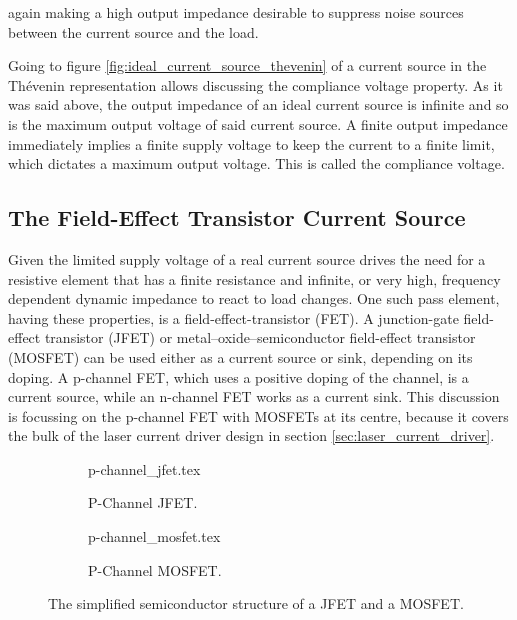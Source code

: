 again making a high output impedance desirable to suppress noise sources between the current source and the load.

Going to figure \ref{fig:ideal_current_source_thevenin} of a current source in the Thévenin representation allows discussing the compliance voltage property. As it was said above, the output impedance of an ideal current source is infinite and so is the maximum output voltage of said current source. A finite output impedance immediately implies a finite supply voltage to keep the current to a finite limit, which dictates a maximum output voltage. This is called the compliance voltage.

\subsection{The Field-Effect Transistor Current Source}%
\label{sec:mosfet_current_source}
Given the limited supply voltage of a real current source drives the need for a resistive element that has a finite resistance and infinite, or very high, frequency dependent dynamic impedance to react to load changes. One such pass element, having these properties, is a field-effect-transistor (FET). A junction-gate field-effect transistor (JFET) or metal–oxide–semiconductor field-effect transistor (MOSFET) can be used either as a current source or sink, depending on its doping. A p-channel FET, which uses a positive doping of the channel, is a current source, while an n-channel FET works as a current sink. This discussion is focussing on the p-channel FET with MOSFETs at its centre, because it covers the bulk of the laser current driver design in section \ref{sec:laser_current_driver}.
\begin{figure}[hb]
    \centering
    \begin{subfigure}{0.4\linewidth}
        \centering
        {p-channel_jfet.tex}
        \caption{P-Channel JFET.}
        \label{fig:pjfet}
    \end{subfigure}
    \begin{subfigure}{0.4\linewidth}
        \centering
        {p-channel_mosfet.tex}
        \caption{P-Channel MOSFET.}
        \label{fig:pmos}
    \end{subfigure}
    \caption{The simplified semiconductor structure of a JFET and a MOSFET.}
    \label{fig:FETs}
\end{figure}

